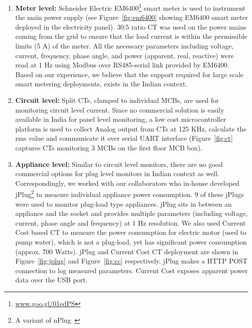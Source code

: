 \documentclass[10pt]{sensys-proc}
\newcommand{\figref}[1]{Figure~\ref{#1}}
\newcommand{\denselistbib}{
  \itemsep -.6pt\topsep-4pt\partopsep-20pt
}
\begin{document}
\begin{enumerate}\denselistbib
\item \textbf{Meter level:} Schneider Electric EM6400\footnote{\url{www.goo.gl/01edPS}} smart meter is used to instrument the main power supply (see \figref{fig:em6400} showing EM6400 smart meter deployed in the electricity panel). %
30:5 ratio CT was used on the power mains coming from the grid to ensure that the load current is within the permissible limits (5 A) of the meter. All the necessary parameters including voltage, current, frequency, phase angle, and power (apparent, real, reactive) were read at 1 Hz using Modbus over RS485-serial link provided by EM6400. Based on our experience, we believe that the support required for large scale smart metering deployments, exists in the Indian context. 

\item \textbf{Circuit level:} Split CTs, clamped to individual MCBs, are used for monitoring circuit level current. Since no commercial solution is easily available in India for panel level monitoring, a low cost microcontroller platform is used to collect Analog output from CTs at 125 KHz, calculate the rms value and communicate it over serial UART interface (\figref{fig:ct} captures CTs monitoring 3 MCBs on the first floor MCB box).

\item \textbf{Appliance level:} Similar to circuit level monitors, there are no good commercial options for plug level monitors in Indian context as well. Correspondingly, we worked with our collaborators who in-house developed jPlug\footnote{A variant of nPlug~\cite{nplug}} to measure individual appliance power consumption. 9 of these jPlugs were used to monitor plug-load type appliances. jPlug sits in between an appliance and the socket and provides multiple parameters (including voltage, current, phase angle and frequency) at 1 Hz resolution. We also used Current Cost based CT to measure the power consumption for electric motor (used to pump water), which is not a plug-load, yet has significant power consumption (approx. 700 Watts). jPlug and Current Cost CT deployment are shown in \figref{fig:jplug} and \figref{fig:cc} respectively. jPlug makes a HTTP POST connection to log measured parameters. Current Cost exposes apparent power data over the USB port. 
\end{enumerate}
\end{document}

